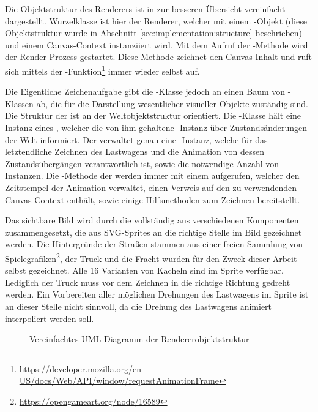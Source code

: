 Die Objektstruktur des Renderers ist in  zur besseren Übersicht vereinfacht dargestellt. Wurzelklasse ist hier der Renderer, welcher mit einem -Objekt (diese Objektstruktur wurde in Abschnitt \ref{sec:implementation:structure} beschrieben) und einem Can\-vas-Con\-text instanziiert wird. Mit dem Aufruf der -Me\-tho\-de wird der Render-Prozess gestartet. Diese Methode zeichnet den Can\-vas-In\-halt und ruft sich mittels der -Funktion\footnote{\url{https://developer.mozilla.org/en-US/docs/Web/API/window/requestAnimationFrame}} immer wieder selbst auf.

Die Eigentliche Zeichenaufgabe gibt die -Klas\-se jedoch an einen Baum von -Klas\-sen ab, die für die Darstellung wesentlicher visueller Objekte zuständig sind. Die Struktur der  ist an der Weltobjektstruktur orientiert. Die -Klas\-se hält eine Instanz eines , welcher die von ihm gehaltene -In\-stanz über Zustandsänderungen der Welt informiert. Der  verwaltet genau eine -In\-stanz, welche für das letztendliche Zeichnen des Lastwagens und die Animation von dessen Zustandsübergängen verantwortlich ist, sowie die notwendige Anzahl von -In\-stanz\-en. Die -Me\-tho\-de der  werden immer mit einem  aufgerufen, welcher den Zeitstempel der Animation verwaltet, einen Verweis auf den zu verwendenden Can\-vas-Con\-text enthält, sowie einige Hilfsmethoden zum Zeichnen bereitstellt.

Das sichtbare Bild wird durch die  vollständig aus verschiedenen Komponenten zusammengesetzt, die aus SVG-Sprites an die richtige Stelle im Bild gezeichnet werden. Die Hintergründe der Straßen stammen aus einer freien Sammlung von Spielegrafiken\footnote{\url{https://opengameart.org/node/16589}}, der Truck und die Fracht wurden für den Zweck dieser Arbeit selbst gezeichnet. Alle 16 Varianten von Kacheln sind im Sprite verfügbar. Lediglich der Truck muss vor dem Zeichnen in die richtige Richtung gedreht werden. Ein Vorbereiten aller möglichen Drehungen des Lastwagens im Sprite ist an dieser Stelle nicht sinnvoll, da die Drehung des Lastwagens animiert interpoliert werden soll.

\begin{figure}
  
  \caption{Vereinfachtes UML-Diagramm der Rendererobjektstruktur}
  \label{sec:implementation:rendering:structure:uml}
\end{figure}


